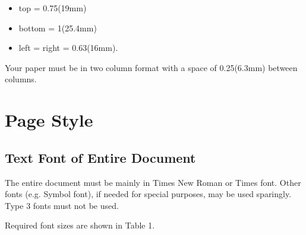 \documentclass[conference,10pt,letterpaper]{IEEEtran}%
\begin{document}
\begin{itemize}
\item	top = 0.75\textquotedbl (19mm)
\item	bottom = 1\textquotedbl (25.4mm)
\item	left = right = 0.63\textquotedbl (16mm).
\end{itemize}

Your paper must be in two column format with a space of 0.25\textquotedbl (6.3mm)
between columns.


\section{Page Style}
\label{sec:page style}


\subsection{Text Font of Entire Document}

The entire document must be mainly in Times New Roman or Times font.
Other fonts (e.g. Symbol font), if needed for special purposes, may be
used sparingly. Type 3 fonts must not be used.

Required font sizes are shown in Table 1.
\end{document}
